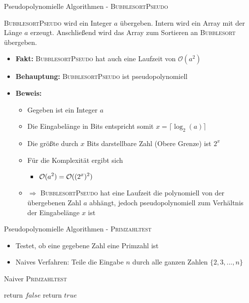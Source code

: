 \begin{frame}{Pseudopolynomielle Algorithmen - \textsc{BubblesortPseudo}}
	
	\textsc{BubblesortPseudo} wird ein Integer $a$ übergeben. Intern wird ein Array mit der Länge $a$ erzeugt. Anschließend wird das Array zum Sortieren an \textsc{Bubblesort} übergeben.
	
	\begin{itemize}
		
		\item \textbf{Fakt:} \textsc{BubblesortPseudo} hat auch eine Laufzeit von $\mathcal{O}(a^2)$
		\item \textbf{Behauptung:} \textsc{BubblesortPseudo} ist pseudopolynomiell
		\pause
		\item \textbf{Beweis:} 
		\begin{itemize}
			\item Gegeben ist ein Integer $a$ 
			\item Die Eingabelänge in Bits entspricht somit $x = \lceil \log_2(a) \rceil$
			\item Die größte durch $x$ Bits darstellbare Zahl (Obere Grenze) ist $2^x$
			\item Für die Komplexität ergibt sich
			\begin{itemize}
				\item $\displaystyle \mathcal{O}(a^2) = \mathcal{O}((2^x)^2)$
			\end{itemize}
			\item[] $\Rightarrow$ \textsc{BubblesortPseudo} hat eine Laufzeit die polynomiell von der übergebenen Zahl $a$ abhängt, jedoch pseudopolynomiell zum Verhältnis der Eingabelänge $x$ ist
		\end{itemize}
	\end{itemize}
\end{frame}

\begin{frame}{Pseudopolynomielle Algorithmen - \textsc{Primzahltest}}
	\begin{itemize}
		\item Testet, ob eine gegebene Zahl eine Primzahl ist
		\item Naives Verfahren: Teile die Eingabe $n$ durch alle ganzen Zahlen $\{2,3,...,n\}$
	\end{itemize}
	
	\begin{algorithm}[H]
		\caption{Naiver \textsc{Primzahltest}}
		\begin{algorithmic}
			\State return $false$
			\EndIf
			\EndFor
			\State return $true$
			\EndFunction
		\end{algorithmic}
	\end{algorithm}
\end{frame}

